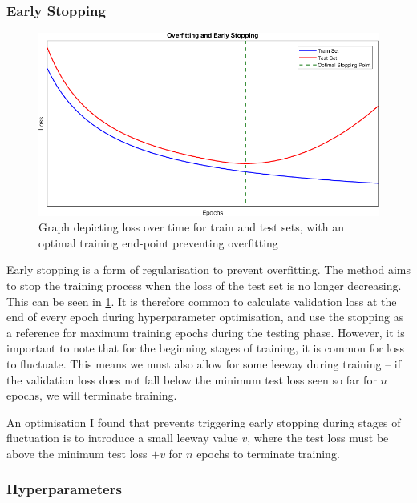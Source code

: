 \documentclass[12pt,a4paper,twoside,openright]{report}
\begin{document}
\subsubsection{Early Stopping}
\label{sec:implLSTMEarly}

\begin{figure}[H]
\centering
\vspace{10pt}
\includegraphics[width=\textwidth]{EarlyStopping.png}
\caption{Graph depicting loss over time for train and test sets, with an optimal training end-point preventing overfitting}
\label{fig:early}
\end{figure}

Early stopping is a form of regularisation to prevent overfitting. The method
aims to stop the training process when the loss of the test set is no longer
decreasing. This can be seen in \cref{fig:early}. It is therefore common
to calculate validation loss at the end of every epoch during hyperparameter optimisation,
and use the stopping as a reference for maximum training epochs during the testing phase.
However, it is important to note that for the beginning stages
of training, it is common for loss to fluctuate. This means we must also
allow for some leeway during training -- if the validation loss does not fall below the
minimum test loss seen so far for $n$ epochs, we will terminate training.

An optimisation I found that prevents
triggering early stopping during stages of fluctuation is to introduce
a small leeway value $v$, where the test loss must be above the minimum test
loss $+ v$ for $n$ epochs to terminate training.

\subsubsection{Hyperparameters}
\label{sec:implLSTMHyper}
\end{document}
